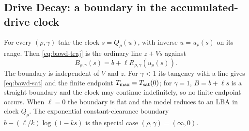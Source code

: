 \documentclass[12pt]{article}
\theoremstyle{remark}
\begin{document}
\subsection{Drive Decay: a boundary in the accumulated-drive clock}
For every $(\rho,\gamma)$ take the clock $s=Q_\rho(u)$, with inverse $u=u_\rho(s)$ on its range. Then \eqref{eq:bawd-traj} is the ordinary line $z+Vs$ against
\begin{equation}
 B_{\rho,\gamma}(s)=b+\ell R_{\rho,\gamma}(u_\rho(s)).
\label{eq:bawd-boundary}
\end{equation}
The boundary is independent of $V$ and $z$. For $\gamma<1$ its tangency with a line gives \eqref{eq:bawd-sat} and the finite endpoint $T_{\max}=T_{\rm sat}(0)$; for $\gamma=1$, $B=b+\ell s$ is a straight boundary and the clock may continue indefinitely, so no finite endpoint occurs. When $\ell=0$ the boundary is flat and the model reduces to an LBA in clock $Q_\rho$. The exponential constant-clearance boundary $b-(\ell/k)\log(1-ks)$ is the special case $(\rho,\gamma)=(\infty,0)$.
\end{document}
